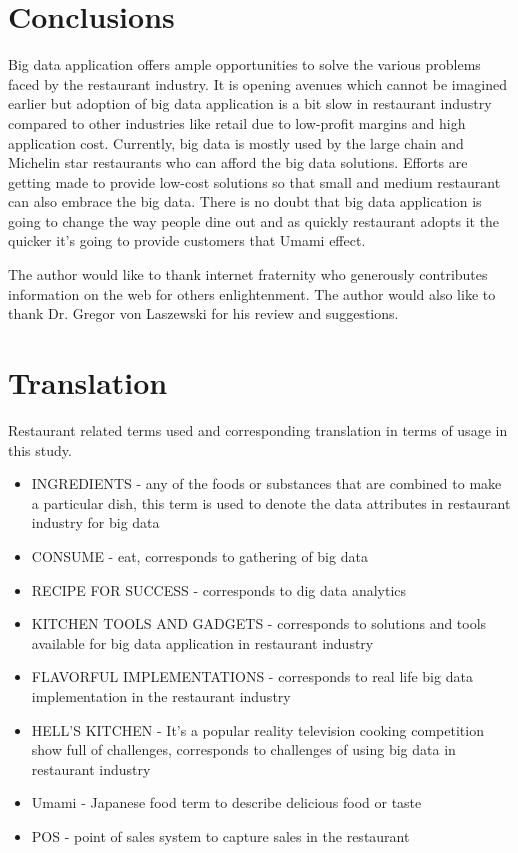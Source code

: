 \documentclass[sigconf]{acmart}
\begin{document}
\section{Conclusions}

Big data application offers ample opportunities to solve the various problems faced by the restaurant industry. It is opening avenues which cannot be imagined earlier but adoption of big data application is a bit slow in restaurant industry compared to other industries like retail due to low-profit margins and high application cost. Currently, big data is mostly used by the large chain and Michelin star restaurants who can afford the big data solutions. Efforts are getting made to provide low-cost solutions so that small and medium restaurant can also embrace the big data. There is no doubt that big data application is going to change the way people dine out and as quickly restaurant adopts it the quicker it's going to provide customers that Umami effect.

\begin{acks}
  The author would like to thank internet fraternity who generously contributes information on the web for others enlightenment.  The author would also like to thank Dr. Gregor von Laszewski for his review and suggestions.
\end{acks}



 

\appendix

\section{Translation}
Restaurant related terms used and corresponding translation in terms of usage in this study.
\begin{itemize}
  \item INGREDIENTS - any of the foods or substances that are combined to make a particular dish, this term is used to denote the data attributes in restaurant industry for big data
  \item CONSUME - eat, corresponds to gathering of big data
  \item RECIPE FOR SUCCESS - corresponds to dig data analytics
  \item KITCHEN TOOLS AND GADGETS  - corresponds to solutions and tools available for big data application in restaurant industry
  \item FLAVORFUL IMPLEMENTATIONS - corresponds to real life big data implementation in the restaurant industry
 \item HELL'S KITCHEN - It's a popular reality television cooking competition show full of challenges, corresponds to challenges of using big data in restaurant industry
 \item Umami - Japanese food term to describe delicious food or taste
 \item POS - point of sales system to capture sales in the restaurant
\end{itemize}
\end{document}
